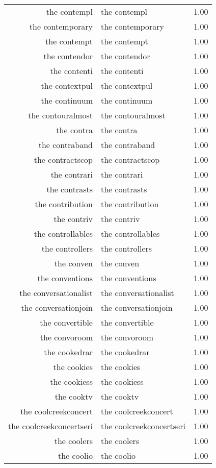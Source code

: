 \begin{table}[ht]
\begin{tabular}{rlr}
  the contempl & the contempl & 1.00 \\ 
  the contemporary & the contemporary & 1.00 \\ 
  the contempt & the contempt & 1.00 \\ 
  the contendor & the contendor & 1.00 \\ 
  the contenti & the contenti & 1.00 \\ 
  the contextpul & the contextpul & 1.00 \\ 
  the continuum & the continuum & 1.00 \\ 
  the contouralmost & the contouralmost & 1.00 \\ 
  the contra & the contra & 1.00 \\ 
  the contraband & the contraband & 1.00 \\ 
  the contractscop & the contractscop & 1.00 \\ 
  the contrari & the contrari & 1.00 \\ 
  the contrasts & the contrasts & 1.00 \\ 
  the contribution & the contribution & 1.00 \\ 
  the contriv & the contriv & 1.00 \\ 
  the controllables & the controllables & 1.00 \\ 
  the controllers & the controllers & 1.00 \\ 
  the conven & the conven & 1.00 \\ 
  the conventions & the conventions & 1.00 \\ 
  the conversationalist & the conversationalist & 1.00 \\ 
  the conversationjoin & the conversationjoin & 1.00 \\ 
  the convertible & the convertible & 1.00 \\ 
  the convoroom & the convoroom & 1.00 \\ 
  the cookedrar & the cookedrar & 1.00 \\ 
  the cookies & the cookies & 1.00 \\ 
  the cookiess & the cookiess & 1.00 \\ 
  the cooktv & the cooktv & 1.00 \\ 
  the coolcreekconcert & the coolcreekconcert & 1.00 \\ 
  the coolcreekconcertseri & the coolcreekconcertseri & 1.00 \\ 
  the coolers & the coolers & 1.00 \\ 
  the coolio & the coolio & 1.00 \\ 

\end{tabular}
\end{table}
